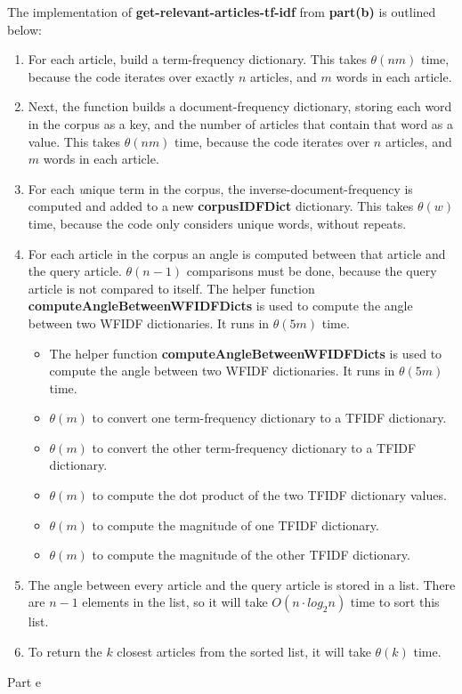 \documentclass[12pt,twoside]{article}
\begin{document}
\begin{problems}
\begin{problemparts}

\newcommand{\functionb}{get-relevant-articles-tf-idf}


The implementation of {\bf \functionb} from {\bf part(b)} is outlined below:
\begin{enumerate}
	\item For each article, build a term-frequency dictionary. This takes $\theta(nm)$ time, because the code iterates over exactly $n$ articles, and $m$ words in each article.
	\item Next, the function builds a document-frequency dictionary, storing each word in the corpus as a key, and the number of articles that contain that word as a value. This takes $\theta(nm)$ time, because the code iterates over $n$ articles, and $m$ words in each article.
	\item For each {\textit unique} term in the corpus, the inverse-document-frequency is computed and added to a new {\bf corpusIDFDict} dictionary. This takes $\theta(w)$ time, because the code only considers unique words, without repeats.
	\item For each article in the corpus an angle is computed between that article and the query article. $\theta(n-1)$ comparisons must be done, because the query article is not compared to itself. The helper function {\bf computeAngleBetweenWFIDFDicts} is used to compute the angle between two WFIDF dictionaries. It runs in $\theta(5m)$ time.
		\begin{itemize}
			\item The helper function {\bf computeAngleBetweenWFIDFDicts} is used to compute the angle between two WFIDF dictionaries. It runs in $\theta(5m)$ time.
			\item $\theta(m)$ to convert one term-frequency dictionary to a TFIDF dictionary.
			\item $\theta(m)$ to convert the other term-frequency dictionary to a TFIDF dictionary.
			\item $\theta(m)$ to compute the dot product of the two TFIDF dictionary values.
			\item $\theta(m)$ to compute the magnitude of one TFIDF dictionary.
			\item $\theta(m)$ to compute the magnitude of the other TFIDF dictionary.
		\end{itemize}
	\item The angle between every article and the query article is stored in a list. There are $n-1$ elements in the list, so it will take $O(n \cdot log_2n)$ time to sort this list.
	\item To return the $k$ closest articles from the sorted list, it will take $\theta(k)$ time.
\end{enumerate}





\problempart Part e %
\end{problemparts}

\end{problems}
\end{document}
